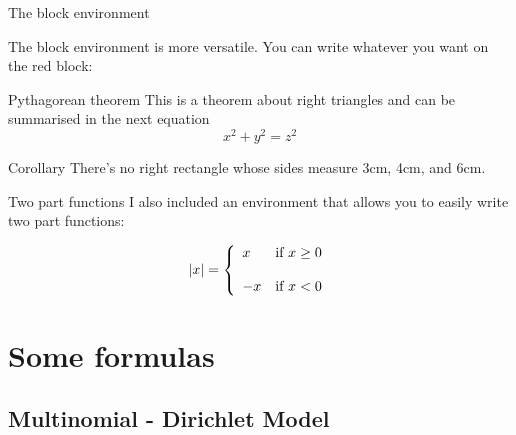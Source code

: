 \begin{frame}{The block environment}

The block environment is more versatile. You can write whatever you want on the red block:

\begin{block}{Pythagorean theorem}
This is a theorem about right triangles and can be summarised in the next 
equation 
\[ x^2 + y^2 = z^2 \]
\end{block}

\begin{block}{Corollary}
There's no right rectangle whose sides measure 3cm, 4cm, and 6cm.
\end{block}

\end{frame}


\begin{frame}{Two part functions}
I also included an environment that allows you to easily write two part functions:

$$|x| =\left\{ \begin{array}{ll} x & \mbox{if } x \geq 0 \\ \\ -x & \mbox{if } x < 0 \end{array} \right.$$

\end{frame}

\section{Some formulas}

\subsection{Multinomial - Dirichlet Model}


